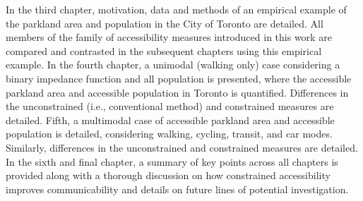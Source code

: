 \documentclass[
11pt, %
oneside, %
english, %
singlespacing, %
]{macthesis} %
\def\blankpage{%
      \clearpage%
      \thispagestyle{empty}%
      \addtocounter{page}{-1}%
      \null%
      \clearpage}
\begin{document}
In the third chapter, motivation, data and methods of an empirical example of the parkland area and population in the City of Toronto are detailed. All members of the family of accessibility measures introduced in this work are compared and contrasted in the subsequent chapters using this empirical example. In the fourth chapter, a unimodal (walking only) case considering a binary impedance function and all population is presented, where the accessible parkland area and accessible population in Toronto is quantified. Differences in the unconstrained (i.e., conventional method) and constrained measures are detailed. Fifth, a multimodal case of accessible parkland area and accessible population is detailed, considering walking, cycling, transit, and car modes. Similarly, differences in the unconstrained and constrained measures are detailed. In the sixth and final chapter, a summary of key points across all chapters is provided along with a thorough discussion on how constrained accessibility improves communicability and details on future lines of potential investigation.
\blankpage
\clearpage

\end{document}
